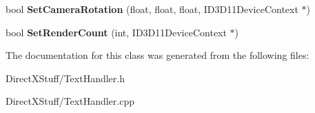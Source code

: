 \begin{DoxyCompactItemize}
\item 
\hypertarget{class_text_handler_a9e28ff9de9d28fc407a321fcbdf3398c}{bool {\bfseries Set\-Camera\-Rotation} (float, float, float, I\-D3\-D11\-Device\-Context $\ast$)}\label{class_text_handler_a9e28ff9de9d28fc407a321fcbdf3398c}

\item 
\hypertarget{class_text_handler_a93c9dda61915a4173f75e88164f73101}{bool {\bfseries Set\-Render\-Count} (int, I\-D3\-D11\-Device\-Context $\ast$)}\label{class_text_handler_a93c9dda61915a4173f75e88164f73101}

\end{DoxyCompactItemize}


The documentation for this class was generated from the following files\-:\begin{DoxyCompactItemize}
\item 
Direct\-X\-Stuff/Text\-Handler.\-h\item 
Direct\-X\-Stuff/Text\-Handler.\-cpp\end{DoxyCompactItemize}
